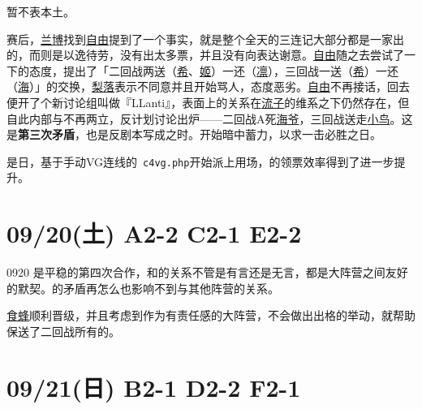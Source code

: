 暂不表本土。

赛后，\uline{兰博}找到\uline{自由}提到了一个事实，就是整个全天的三连记大部分都是一家出的，而则是以逸待劳，没有出太多票，并且没有向表达谢意。\uline{自由}随之去尝试了一下的态度，提出了「二回战两送（\uline{希}、\uline{姬}）一还（\uline{凛}），三回战一送（\uline{希}）一还（\uline{海}）」的交换，\uline{梨落}表示不同意并且开始骂人，态度恶劣。\uline{自由}不再接话，回去便开了个新讨论组叫做『LLanti』，表面上的关系在\uline{流子}的维系之下仍然存在，但自此内部与不再两立，反计划讨论出炉——二回战A死\uline{海爷}，三回战送走\uline{小鸟}。这是\textbf{第三次矛盾}，也是反剧本写成之时。开始暗中蓄力，以求一击必胜之日。

是日，基于手动VG连线的~\verb=c4vg.php=开始派上用场，的领票效率得到了进一步提升。

\section{09/20(土) A2-2 C2-1 E2-2}


0920 是平稳的第四次合作，和的关系不管是有言还是无言，都是大阵营之间友好的默契。的矛盾再怎么也影响不到与其他阵营的关系。

\uline{食蜂}顺利晋级，并且考虑到作为有责任感的大阵营，不会做出出格的举动，就帮助保送了二回战所有的。

\section{09/21(日) B2-1 D2-2 F2-1}


